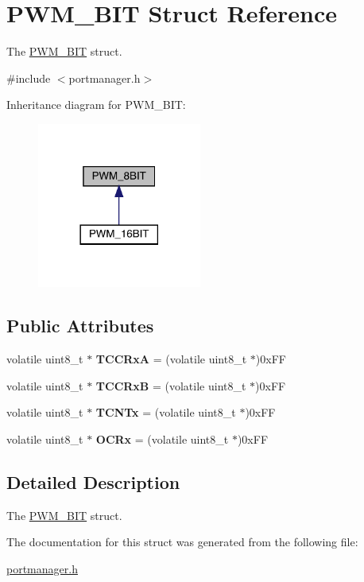 \hypertarget{structPWM__8BIT}{}\section{P\+W\+M\+\_\+B\+IT Struct Reference}
\label{structPWM__8BIT}


The \mbox{\hyperlink{structPWM__8BIT}{P\+W\+M\+\_\+B\+IT}} struct.  




{\ttfamily \#include $<$portmanager.\+h$>$}



Inheritance diagram for P\+W\+M\+\_\+B\+IT\+:\nopagebreak
\begin{figure}[H]
\begin{center}
\leavevmode
\includegraphics[width=153pt]{structPWM__8BIT__inherit__graph}
\end{center}
\end{figure}
\subsection*{Public Attributes}
\begin{DoxyCompactItemize}
\item 
\mbox{\label{structPWM__8BIT_a67a66abe93d97084f94c41c4bb4264b7}} 
volatile uint8\+\_\+t $\ast$ {\bfseries T\+C\+C\+RxA} = (volatile uint8\+\_\+t $\ast$)0x\+FF
\item 
\mbox{\label{structPWM__8BIT_a9b5a0f38311b0914a5011204a0039255}} 
volatile uint8\+\_\+t $\ast$ {\bfseries T\+C\+C\+RxB} = (volatile uint8\+\_\+t $\ast$)0x\+FF
\item 
\mbox{\label{structPWM__8BIT_ad1f2062ca0b4dce0decf2282f045f56e}} 
volatile uint8\+\_\+t $\ast$ {\bfseries T\+C\+N\+Tx} = (volatile uint8\+\_\+t $\ast$)0x\+FF
\item 
\mbox{\label{structPWM__8BIT_aac6d531b2442f9217341d7c1e27aa54d}} 
volatile uint8\+\_\+t $\ast$ {\bfseries O\+C\+Rx} = (volatile uint8\+\_\+t $\ast$)0x\+FF
\end{DoxyCompactItemize}


\subsection{Detailed Description}
The \mbox{\hyperlink{structPWM__8BIT}{P\+W\+M\+\_\+B\+IT}} struct. 

The documentation for this struct was generated from the following file\+:\begin{DoxyCompactItemize}
\item 
\mbox{\hyperlink{portmanager_8h}{portmanager.\+h}}\end{DoxyCompactItemize}
